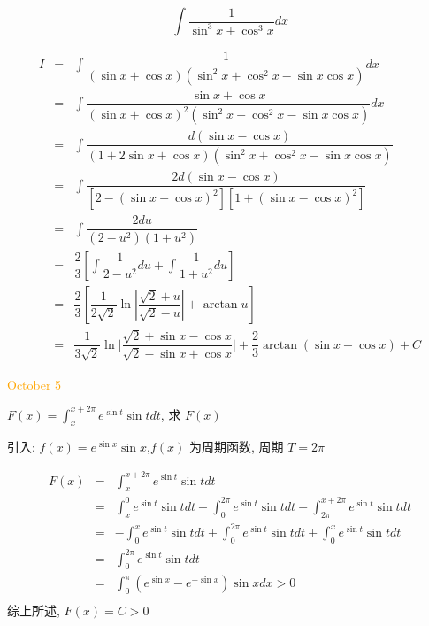 \begin{example}[][Exam: 36.1.8]
	$$\int\dfrac{1}{\sin^{3} x+\cos^{3} x}dx$$
\end{example}

\begin{solution}  
	\begin{eqnarray*}
		I & = & \int \dfrac{1}{(\sin x+\cos x)(\sin^2 x+\cos^2 x-\sin x\cos x)}dx\\
		  & = & \int \dfrac{\sin x+\cos x}{(\sin x+\cos x)^{2}(\sin^2 x+\cos^2 x-\sin x\cos x)}dx\\
		  & = & \int \dfrac{d(\sin x-\cos x)}{(1+2\sin x+\cos x)(\sin^2 x+\cos^2 x-\sin x\cos x)}\\
		  & = & \int \dfrac{2d(\sin x-\cos x)}{\left[2-(\sin x-\cos x)^2\right]\left[1+(\sin x-\cos x)^2\right]}\\
		  & = & \int \dfrac{2du}{(2-u^2)(1+u^2)}\\
		  & = & \dfrac{2}{3}\left[\int\dfrac{1}{2-u^2}du+\int\dfrac{1}{1+u^2}du\right]\\
		  & = & \dfrac{2}{3}\left[\dfrac{1}{2\sqrt{2}}\ln|\dfrac{\sqrt{2}+u}{\sqrt{2}-u}|+\arctan u\right]\\
		  & = & \dfrac{1}{3\sqrt{2}}\ln\big|\dfrac{\sqrt{2}+\sin x-\cos x}{\sqrt{2}-\sin x+\cos x}\big|+\dfrac{2}{3}\arctan(\sin x-\cos x)+C
	\end{eqnarray*}
\end{solution}


\textcolor{orange}{October 5}

\begin{example}[][Exam: 36.1.9]
	$\displaystyle{F(x)=\int_{x}^{x+2\pi}e^{\sin t}\sin tdt}$, 求 $F(x)$
\end{example} 

\begin{solution}

	引入: $f(x)=e^{\sin x}\sin x$,$f(x)$ 为周期函数, 周期 $T = 2\pi$

	\begin{eqnarray*}
		F(x) & = & \int_{x}^{x+2\pi}e^{\sin t}\sin tdt\\
		     & = & \int_{x}^{0}e^{\sin t}\sin tdt + \int_{0}^{2\pi}e^{\sin t}\sin tdt + \int_{2\pi}^{x+2\pi}e^{\sin t}\sin tdt\\
		     & = & -\int_{0}^{x}e^{\sin t}\sin tdt + \int_{0}^{2\pi}e^{\sin t}\sin tdt + \int_{0}^{x}e^{\sin t}\sin tdt\\
		     & = & \int_{0}^{2\pi}e^{\sin t}\sin tdt\\
		     & = & \int_{0}^{\pi}(e^{\sin x}-e^{-\sin x})\sin xdx>0\\
	\end{eqnarray*}
	综上所述, $F(x)=C>0$
\end{solution}

